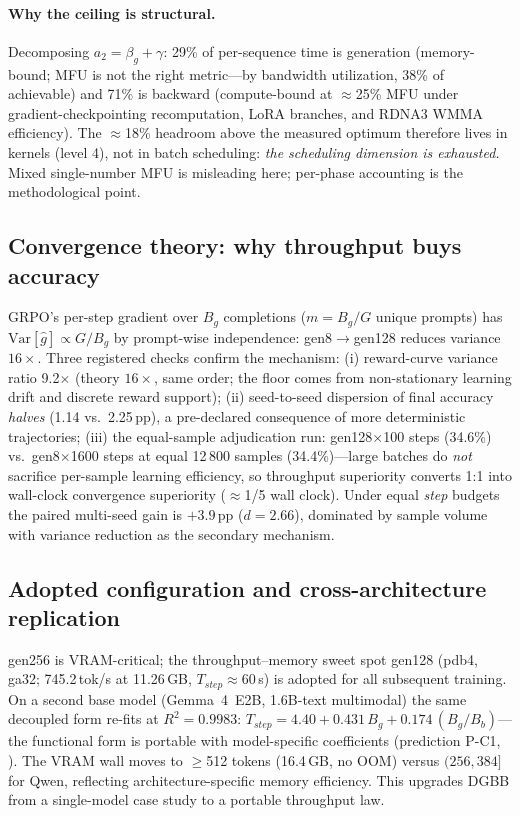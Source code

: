 \documentclass[11pt]{article}
\theoremstyle{definition}
\begin{document}
\paragraph{Why the ceiling is structural.} Decomposing $a_2=\beta_g+\gamma$: 29\%
of per-sequence time is generation (memory-bound; MFU is not the right metric---by
bandwidth utilization, 38\% of achievable) and 71\% is backward (compute-bound at
$\approx$25\% MFU under gradient-checkpointing recomputation, LoRA branches, and
RDNA3 WMMA efficiency). The $\approx$18\% headroom above the measured optimum
therefore lives in kernels (level 4), not in batch scheduling: \emph{the
scheduling dimension is exhausted.} Mixed single-number MFU is misleading here;
per-phase accounting is the methodological point.

\subsection{Convergence theory: why throughput buys accuracy}\label{sec:l1-conv}
GRPO's per-step gradient over $B_g$ completions ($m{=}B_g/G$ unique prompts) has
$\mathrm{Var}[\hat g]\propto G/B_g$ by prompt-wise independence: gen8$\to$gen128
reduces variance $16\times$. Three registered checks confirm the mechanism:
(i) reward-curve variance ratio 9.2$\times$ (theory $16\times$, same order; the
floor comes from non-stationary learning drift and discrete reward support);
(ii) seed-to-seed dispersion of final accuracy \emph{halves} (1.14 vs.\ 2.25\,pp),
a pre-declared consequence of more deterministic trajectories; (iii) the
equal-sample adjudication run: gen128$\times$100 steps (34.6\%) vs.\
gen8$\times$1600 steps at equal 12\,800 samples (34.4\%)---large batches do
\emph{not} sacrifice per-sample learning efficiency, so throughput superiority
converts 1:1 into wall-clock convergence superiority ($\approx$1/5 wall clock).
Under equal \emph{step} budgets the paired multi-seed gain is $+3.9$\,pp
($d{=}2.66$), dominated by sample volume with variance reduction as the secondary
mechanism.

\subsection{Adopted configuration and cross-architecture replication}\label{sec:l1-adopt}
gen256 is VRAM-critical; the throughput--memory sweet spot gen128 (pdb4, ga32;
745.2\,tok/s at 11.26\,GB, $T_{step}\approx60$\,s) is adopted for all subsequent
training. On a second base model (Gemma~4~E2B, 1.6B-text multimodal) the same
decoupled form re-fits at $R^2{=}0.9983$:
$T_{step}=4.40+0.431\,B_g+0.174\,(B_g/B_b)$---the functional form is portable
with model-specific coefficients (prediction P-C1, \checkmark). The VRAM wall moves
to $\ge$512 tokens (16.4\,GB, no OOM) versus $(256,384]$ for Qwen, reflecting
architecture-specific memory efficiency. This upgrades DGBB from a single-model
case study to a portable throughput law.
\end{document}
